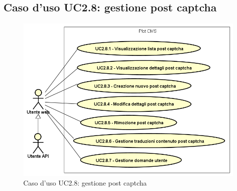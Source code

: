\subsection{Caso d'uso UC2.8: gestione post captcha}

        \begin{figure}[H]
            \centering
            \includegraphics[scale=0.95, width=\textwidth]{immagini/usecase/UC2-8.png}
            \caption{Caso d'uso UC2.8: gestione post captcha}\label{fig:UC2.8} 
        \end{figure}
